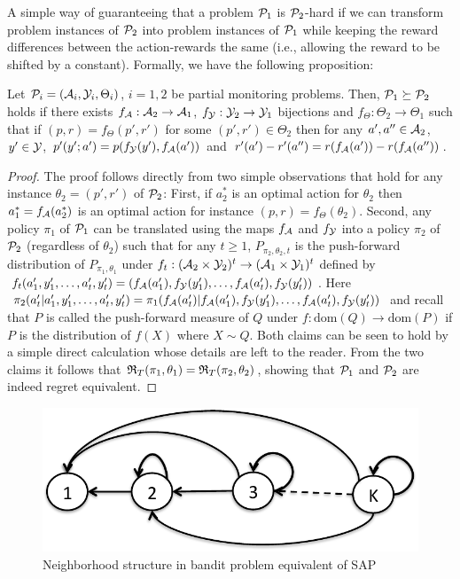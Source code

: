 A simple way of guaranteeing that a problem $\P_1$ is $\P_2$-hard if we can transform problem instances of $\P_2$ into 
problem instances of $\P_1$ while keeping the reward differences between the action-rewards the same (i.e., allowing the reward to be shifted by a constant).
Formally, we have the following proposition:
\begin{prop}
Let $\P_i = (\A_i,\Y_i,\Theta_i)$, $i=1,2$ be partial monitoring problems.
Then, $\P_1\succeq \P_2$ holds if there exists $f_{\A}:\A_2\to \A_1$, $f_{\Y}: \Y_2 \to \Y_1$ bijections and $f_{\Theta}:\Theta_2\to \Theta_1$ such that if $(p,r) = f_{\Theta}(p',r')$ for some $(p',r')\in \Theta_2$ then
for any $a',a''\in \A_2$, $y'\in \Y$,
$p'(y';a') = p(f_\Y(y'),f_\A(a'))$ and $r'(a')-r'(a'') = r(f_\A(a')) - r(f_\A(a''))$.
\end{prop}
\begin{proof}
The proof follows directly from two simple observations 
that hold for any instance $\theta_2 = (p',r')$ of $\P_2$: 
First, if $a_2^*$ is an optimal action for $\theta_2$
then $a_1^*=f_\A(a_2^*)$ is an optimal action for instance $(p,r) = f_\Theta(\theta_2)$.
Second, any policy $\pi_1$ of $\P_1$ can be translated using the maps $f_\A$ and $f_\Y$ into a policy $\pi_2$ of $\P_2$ (regardless of $\theta_2$) such that
for any $t\ge 1$,
$P_{\pi_2,\theta_2,t}$ is the push-forward distribution 
of $P_{\pi_1,\theta_1}$ under $f_t:(\A_2\times \Y_2)^t \to (\A_1\times \Y_1)^t$
defined by $f_t(a_1',y_1',\dots,a_t',y_t') = (f_\A(a_1'),f_\Y(y_1'),\dots,f_\A(a_t'),f_\Y(y_t'))$. 
Here $\pi_2(a'_t|a_1',y_1',\dots,a_t',y_t') = \pi_1( f_\A(a_t')| f_\A(a_1'),f_\Y(y_1'),\dots,f_\A(a_t'),f_\Y(y_t'))$ and recall that $P$ is called the push-forward measure of $Q$ under $f:\mathrm{dom}(Q)\to \mathrm{dom}(P)$ if $P$ is the distribution of $f(X)$ where $X\sim Q$.
Both claims can be seen to hold by a simple direct calculation whose details are left 
to the reader.
From the two claims it follows that $\Regret_T(\pi_1,\theta_1)
= \Regret_T(\pi_2,\theta_2)$, showing that $\P_1$ and $\P_2$ are indeed
regret equivalent.
\end{proof}

\fi



\begin{figure}
	\centering

	\includegraphics[scale=.4]{../Figures/SideInfoGraph.pdf}
	\caption{ Neighborhood structure in bandit problem equivalent of SAP}
	\label{fig:SideObservationGraph]}

\end{figure} 

